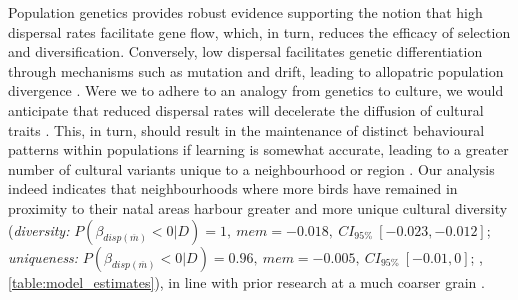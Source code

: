 \documentclass[9pt, onecolumn, twoside, lineno]{gsajnl}
\begin{document}
Population genetics provides robust evidence supporting the notion that high dispersal rates facilitate gene flow, which, in turn, reduces the efficacy of selection and diversification. Conversely, low dispersal facilitates genetic differentiation through mechanisms such as mutation and drift, leading to allopatric population divergence \autocite{suarez2022, claramunt2011, papadopoulou2009}. Were we to adhere to an analogy from genetics to culture, we would anticipate that reduced dispersal rates will decelerate the diffusion of cultural traits \autocite{nunn2009}. This, in turn, should result in the maintenance of distinct behavioural patterns within populations if learning is somewhat accurate, leading to a greater number of cultural variants unique to a neighbourhood or region \autocite{whitehead2012, planque2014}. Our analysis indeed indicates that neighbourhoods where more birds have remained in proximity to their natal areas harbour greater and more unique cultural diversity (\textit{diversity:} $P(\beta_{disp (\overline{m})} < 0 | D) = 1,~ mem = -0.018,~CI_{95\%}~[-0.023, -0.012]$; \textit{uniqueness:} $P(\beta_{disp (\overline{m})} < 0 | D) = 0.96,~ mem = -0.005,~CI_{95\%}~[-0.01, 0]$; , \autoref{table:model_estimates}), in line with prior research at a much coarser grain \autocite{fayet2014}. 
\end{document}

